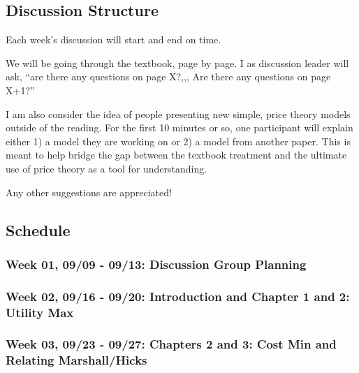 \documentclass[11pt,]{article}
\begin{document}
\hypertarget{discussion-structure}{%
\subsection*{Discussion Structure}\label{discussion-structure}}

Each week's discussion will start and end on time.

We will be going through the textbook, page by page. I as discussion leader will ask, ``are there any questions on page X?,,, Are there any questions on page X+1?''

I am also consider the idea of people presenting new simple, price theory models outside of the reading. For the first 10 minutes or so, one participant will explain either 1) a model they are working on or 2) a model from another paper. This is meant to help bridge the gap between the textbook treatment and the ultimate use of price theory as a tool for understanding.

Any other suggestions are appreciated!
\newpage

\hypertarget{schedule}{%
\subsection*{Schedule}\label{schedule}}

\hypertarget{week-01-0909---0913-discussion-group-planning}{%
\subsubsection*{Week 01, 09/09 - 09/13: Discussion Group Planning}\label{week-01-0909---0913-discussion-group-planning}}

\hypertarget{week-02-0916---0920-introduction-and-chapter-1-and-2-utility-max}{%
\subsubsection*{Week 02, 09/16 - 09/20: Introduction and Chapter 1 and 2: Utility Max}\label{week-02-0916---0920-introduction-and-chapter-1-and-2-utility-max}}

\hypertarget{week-03-0923---0927-chapters-2-and-3-cost-min-and-relating-marshallhicks}{%
\subsubsection*{Week 03, 09/23 - 09/27: Chapters 2 and 3: Cost Min and Relating Marshall/Hicks}\label{week-03-0923---0927-chapters-2-and-3-cost-min-and-relating-marshallhicks}}
\end{document}
